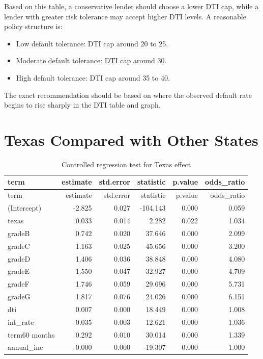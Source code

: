\documentclass[11pt,preprint]{elsarticle}
\numberwithin{equation}{section}
\numberwithin{figure}{section}
\numberwithin{table}{section}
\def\tightlist{} %
\begin{document}
Based on this table, a conservative lender should choose a lower DTI
cap, while a lender with greater risk tolerance may accept higher DTI
levels. A reasonable policy structure is:

\begin{itemize}
\tightlist
\item
  Low default tolerance: DTI cap around 20 to 25.
\item
  Moderate default tolerance: DTI cap around 30.
\item
  High default tolerance: DTI cap around 35 to 40.
\end{itemize}

The exact recommendation should be based on where the observed default
rate begins to rise sharply in the DTI table and graph.

\section{Texas Compared with Other
States}\label{texas-compared-with-other-states}

\begin{longtable}[]{@{}lrrrrr@{}}
\caption{Controlled regression test for Texas effect}\tabularnewline
\toprule\noalign{}
term & estimate & std.error & statistic & p.value & odds\_ratio \\
\midrule\noalign{}
\endfirsthead
\toprule\noalign{}
term & estimate & std.error & statistic & p.value & odds\_ratio \\
\midrule\noalign{}
\endhead
\bottomrule\noalign{}
\endlastfoot
(Intercept) & -2.825 & 0.027 & -104.143 & 0.000 & 0.059 \\
texas & 0.033 & 0.014 & 2.282 & 0.022 & 1.034 \\
gradeB & 0.742 & 0.020 & 37.646 & 0.000 & 2.099 \\
gradeC & 1.163 & 0.025 & 45.656 & 0.000 & 3.200 \\
gradeD & 1.406 & 0.036 & 38.848 & 0.000 & 4.080 \\
gradeE & 1.550 & 0.047 & 32.927 & 0.000 & 4.709 \\
gradeF & 1.746 & 0.059 & 29.696 & 0.000 & 5.731 \\
gradeG & 1.817 & 0.076 & 24.026 & 0.000 & 6.151 \\
dti & 0.007 & 0.000 & 18.449 & 0.000 & 1.008 \\
int\_rate & 0.035 & 0.003 & 12.621 & 0.000 & 1.036 \\
term60 months & 0.292 & 0.010 & 30.014 & 0.000 & 1.339 \\
annual\_inc & 0.000 & 0.000 & -19.307 & 0.000 & 1.000 \\
\end{longtable}
\end{document}

